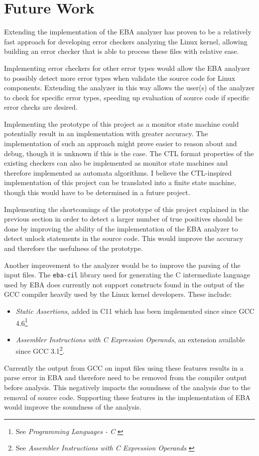 \section{Future Work}

\newpar Extending the implementation of the EBA analyzer has proven to be a relatively fast approach for developing error checkers analyzing the Linux kernel, allowing building an error checker that is able to process these files with relative ease. 

\newpar Implementing error checkers for other error types would allow the EBA analyzer to possibly detect more error types when validate the source code for Linux components. Extending the analyzer in this way allows the user(s) of the analyzer to check for specific error types, speeding up evaluation of source code if specific error checks are desired. 

\newpar Implementing the prototype of this project as a monitor state machine could potentially result in an implementation with greater accuracy. The implementation of such an approach might prove easier to reason about and debug, though it is unknown if this is the case. The CTL format properties of the existing checkers can also be implemented as monitor state machines and therefore implemented as automata algorithms. I believe the CTL-inspired implementation of this project can be translated into a finite state machine, though this would have to be determined in a future project. 

\newpar Implementing the shortcomings of the prototype of this project explained in the previous section in order to detect a larger number of true positives should be done by improving the ability of the implementation of the EBA analyzer to detect unlock statements in the source code. This would improve the accuracy and therefore the usefulness of the prototype.

\newpar Another improvement to the analyzer would be to improve the parsing of the input files. The \texttt{eba-cil} library used for generating the C intermediate language used by EBA does currently not support constructs found in the output of the GCC compiler heavily used by the Linux kernel developers. These include:
\begin{itemize}
    \item \textit{Static Assertions}, added in C11 which has been implemented since since GCC 4.6\footnote{See \textit{Programming Languages - C} \cite{ISO:2011:IIIb}}
    \item \textit{Assembler Instructions with C Expression Operands}, an extension available since GCC 3.1\footnote{See \textit{Assembler Instructions with C Expression Operands} \cite{GCC:3.1}}.
\end{itemize}

\noindent Currently the output from GCC on input files using these features results in a parse error in EBA and therefore need to be removed from the compiler output before analysis. This negatively impacts the soundness of the analysis due to the removal of source code. Supporting these features in the implementation of EBA would improve the soundness of the analysis.